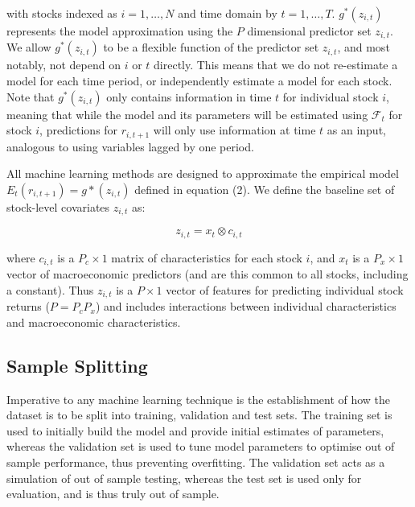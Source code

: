 \documentclass[a4paper, table]{article}
\newcommand{\smalltodo}[2][] {\todo[caption={#2}, size=\scriptsize,%
	fancyline,#1]{\begin{spacing}{.5}#2\end{spacing}}}
\newcommand{\rhs}[2][]{\smalltodo[color=green!30,#1]{{\bf RS:} #2}}
\begin{document}
with stocks indexed as $i = 1, \dots, N$ and time domain by $t = 1, \dots, T$. $g^*(z_{i,t})$ represents the model approximation using the $P$ dimensional predictor set $z_{i,t}$. We allow $g^*(z_{i,t})$ to be a flexible function of the predictor set $z_{i,t}$, and most notably, not depend on $i$ or $t$ directly. This means that we do not re-estimate a model for each time period, or independently estimate a model for each stock. Note that $g^*(z_{i,t})$ only contains information in time $t$ for individual stock $i$, meaning that while the model and its parameters will be estimated using $\mathcal{F}_t$ for stock $i$, predictions for $r_{i, t+1}$ will only use information at time $t$ as an input, analogous to using variables lagged by one period. 

All machine learning methods are designed to approximate the empirical model \( E_t(r_{i, t+1}) = g*(z_{i,t}) \) defined in equation (2). We define the baseline set of stock-level covariates \( z_{i,t} \) as:

\begin{equation}
\label{kronecker_equation}
z_{i,t} = x_t \otimes c_{i,t}
\end{equation}

where \( c_{i,t} \) is a \( P_c \times 1 \) matrix of characteristics for each stock \(i\), and \(x_t\) is a $P_x \times 1$ vector of macroeconomic predictors (and are this common to all stocks, including a constant). Thus $z_{i,t}$ is a $P \times 1$ vector of features for predicting individual stock returns ($P = P_cP_x$) and includes interactions between individual characteristics and macroeconomic characteristics. 

\subsection{Sample Splitting}
\label{sample_split}

\rhs{unclear, re-do slightly}

Imperative to any machine learning technique is the establishment of how the dataset is to be split into training, validation and test sets. The training set is used to initially build the model and provide initial estimates of parameters, whereas the validation set is used to tune model parameters to optimise out of sample performance, thus preventing overfitting. The validation set acts as a simulation of out of sample testing, whereas the test set is used only for evaluation, and is thus truly out of sample.
\end{document}
